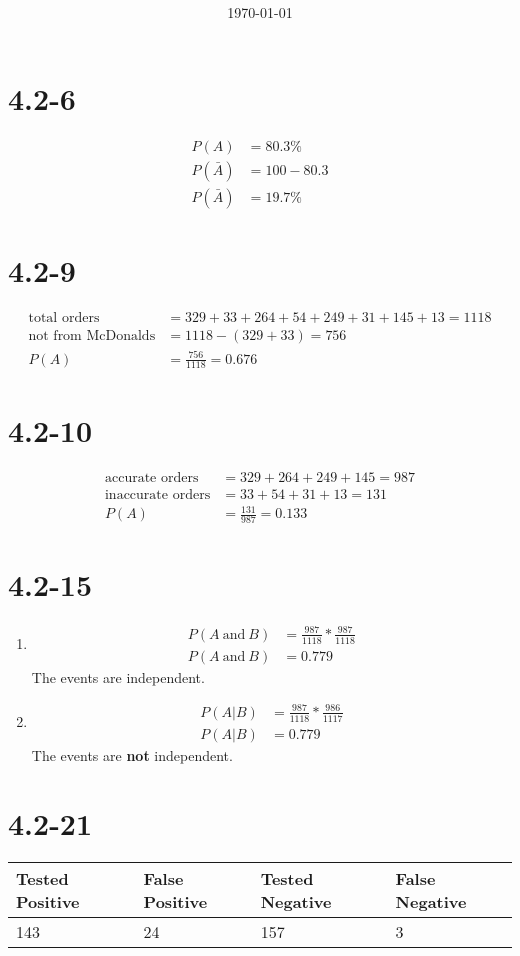 \documentclass[12pt,fleqn]{article}
\title{\classdescription\ \\ \classname\ \\ $\ $ \\ \assignment}
\author{\authorname}
\date{\today}
\newcommand{\chapter}{4.2}
\newcommand{\problem}[1]{\vspace{5ex}\section*{\chapter-#1}}
\newcommand{\thead}[1]{\textnormal{\textbf{#1}}}
\begin{document}
\maketitle

\problem{6}
\begin{align*}
  P(A) &= 80.3\% \\
  P(\bar{A}) &= 100 - 80.3 \\
  P(\bar{A}) &= 19.7\%
\end{align*}


\problem{9}
\begin{align*}
  \text{total orders} &= 329 + 33 + 264 + 54 + 249 + 31 + 145 + 13 = 1118 \\
  \text{not from McDonalds} &= 1118 - (329 + 33) = 756 \\
  P(A) &= \frac{756}{1118} = 0.676
\end{align*}


\problem{10}
\begin{align*}
  \text{accurate orders} &= 329 + 264 + 249 + 145 = 987 \\
  \text{inaccurate orders} &= 33 + 54 + 31 + 13 = 131 \\
  P(A) &= \frac{131}{987} = 0.133
\end{align*}


\problem{15}
\begin{enumerate}[label=\alph*.]
\item
  \begin{align*}
    P(A~\text{and}~B) &= \frac{987}{1118} * \frac{987}{1118} \\
    P(A~\text{and}~B) &= 0.779
  \end{align*}
  The events are independent.
\item
  \begin{align*}
    P(A|B) &= \frac{987}{1118} * \frac{986}{1117} \\
    P(A|B) &= 0.779
  \end{align*}
  The events are \textbf{not} independent.
\end{enumerate}


\problem{21}
\begin{tabular}{@{}llll@{}}
  \thead{Tested Positive} & \thead{False Positive} & \thead{Tested Negative} & \thead{False Negative} \\
  \toprule
  143 & 24 & 157 & 3 \\
  \bottomrule
\end{tabular}
\vspace{.25cm}
\end{document}
